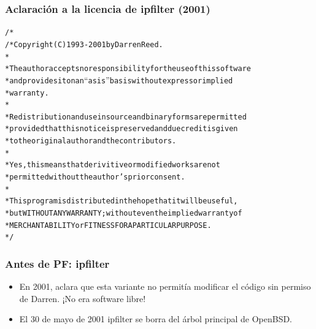\documentclass{beamer}
\begin{document}
\begin{frame}
\frametitle{Aclaración a la licencia de ipfilter (2001)}

\begin{alltt}
\footnotesize
/* \\
/* Copyright (C) 1993-2001 by Darren Reed. \\
 * \\
 * The author accepts no responsibility for the use of this software \\
 * and provides it on an ``as is'' basis without express or implied \\
 *  warranty. \\
 * \\
 * Redistribution and use in source and binary forms are permitted \\
 * provided that this notice is preserved and due credit is given \\
 * to the original author and the contributors. \\
 * \\
 * \alert{Yes, this means that derivitive or modified works are not} \\ 
 * \alert{permitted without the author's prior consent.} \\
 * \\
 * This program is distributed in the hope that it will be useful, \\
 * but WITHOUT ANY WARRANTY; without even the implied warranty of \\
 * MERCHANTABILITY or FITNESS FOR A PARTICULAR PURPOSE. \\
 * /

\end{alltt}

\end{frame}


\begin{frame}
\frametitle{Antes de PF: ipfilter}

\begin{itemize}
\item En 2001, aclara que esta variante no permitía modificar el código \alert{sin permiso} de Darren. ¡\alert{No} era software libre!
\item El 30 de mayo de 2001 ipfilter se borra del árbol principal de OpenBSD.
\end{itemize}

\end{frame}
\end{document}
